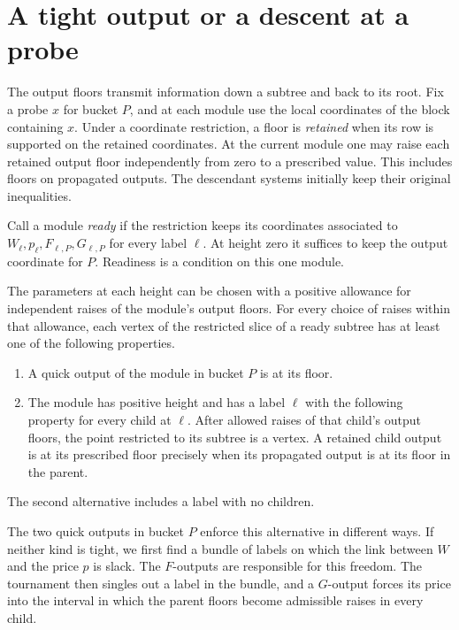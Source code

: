 \section{A tight output or a descent at a probe}\label{sec:vertex}

The output floors transmit information down a subtree and back to
its root. Fix a probe \(x\) for bucket \(P\), and at each module use
the local coordinates of the block containing \(x\). Under a coordinate
restriction, a floor is \emph{retained} when its row is supported on
the retained coordinates. At the current module one may raise each
retained output floor independently from zero to a prescribed value.
This includes floors on propagated outputs. The descendant systems
initially keep their original inequalities.

Call a module \emph{ready} if the restriction keeps its coordinates
associated to \(W_\ell,p_\ell,F_{\ell,P},G_{\ell,P}\) for every label
\(\ell\). At height zero it suffices to keep the output coordinate for
\(P\). Readiness is a condition on this one module.

\begin{lemma}\label{lem:descent}
The parameters at each height can be chosen with a positive allowance
for independent raises of the module's output floors. For every choice
of raises within that allowance, each vertex of the restricted slice
of a ready subtree has at least one of the following properties.
\begin{enumerate}
\item A quick output of the module in bucket $P$ is at its floor.
\item The module has positive height and has a label $\ell$ with the
following property for every child at $\ell$. After allowed raises of
that child's output floors, the point restricted to its subtree is a
vertex. A retained child output is at its prescribed floor precisely
when its propagated output is at its floor in the parent.
\end{enumerate}
The second alternative includes a label with no children.
\end{lemma}

The two quick outputs in bucket \(P\) enforce this alternative in
different ways. If neither kind is tight, we first find a bundle of
labels on which the link between \(W\) and the price \(p\) is slack.
The \(F\)-outputs are responsible for this freedom. The tournament
then singles out a label in the bundle, and a \(G\)-output forces its
price into the interval in which the parent floors become admissible
raises in every child.

